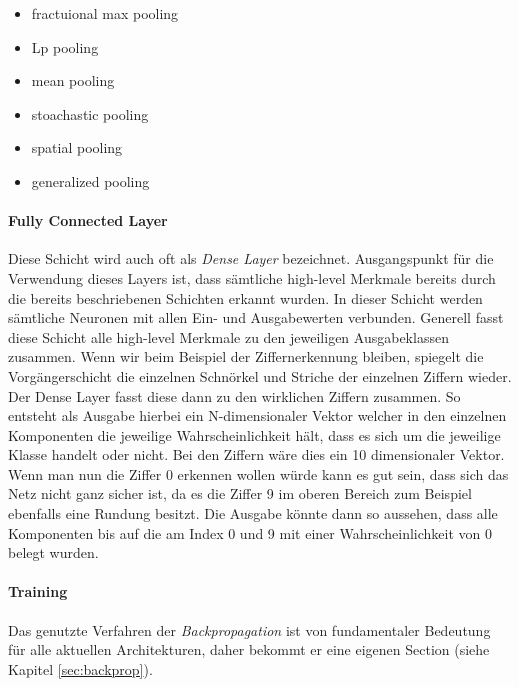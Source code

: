 \begin{itemize}
\item fractuional max pooling
\item Lp pooling
\item mean pooling
\item stoachastic pooling
\item spatial pooling
\item generalized pooling
\end{itemize}


\paragraph{Fully Connected Layer}
Diese Schicht wird auch oft als \emph{Dense Layer} bezeichnet. Ausgangspunkt für die Verwendung dieses Layers ist, dass sämtliche high-level Merkmale bereits durch die bereits beschriebenen Schichten erkannt wurden. In dieser Schicht werden sämtliche Neuronen mit allen Ein- und Ausgabewerten verbunden. Generell fasst diese Schicht alle high-level Merkmale zu den jeweiligen Ausgabeklassen zusammen. Wenn wir beim Beispiel der Ziffernerkennung bleiben, spiegelt die Vorgängerschicht die einzelnen Schnörkel und Striche der einzelnen Ziffern wieder. Der Dense Layer fasst diese dann zu den wirklichen Ziffern zusammen. So entsteht als Ausgabe hierbei ein N-dimensionaler Vektor welcher in den einzelnen Komponenten die jeweilige Wahrscheinlichkeit hält, dass es sich um die jeweilige Klasse handelt oder nicht. Bei den Ziffern wäre dies ein 10 dimensionaler Vektor. Wenn man nun die Ziffer 0 erkennen wollen würde kann es gut sein, dass sich das Netz \glqq nicht ganz sicher \grqq ist, da es die Ziffer 9 im oberen Bereich zum Beispiel ebenfalls eine Rundung besitzt. Die Ausgabe könnte dann so aussehen, dass alle Komponenten bis auf die am Index 0 und 9 mit einer Wahrscheinlichkeit von 0 belegt wurden. 

\paragraph{Training} 
Das genutzte Verfahren der \emph{Backpropagation} ist von fundamentaler Bedeutung für alle aktuellen Architekturen, daher bekommt er eine eigenen Section (siehe Kapitel \ref{sec:backprop}). 
